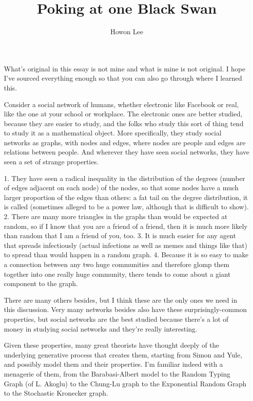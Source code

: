 \documentclass[12pt]{article}
\begin{document}
\title{Poking at one Black Swan}
\author{Howon Lee}
\maketitle

What's original in this essay is not mine and what is mine is not original. I hope I've sourced everything enough so that you can also go through where I learned this.

Consider a social network of humans, whether electronic like Facebook or real, like the one at your school or workplace. The electronic ones are better studied, because they are easier to study, and the folks who study this sort of thing tend to study it as a mathematical object. More specifically, they study social networks as graphs, with nodes and edges, where nodes are people and edges are relations between people. And wherever they have seen social networks, they have seen a set of strange properties. 

1. They have seen a radical inequality in the distribution of the degrees (number of edges adjacent on each node) of the nodes, so that some nodes have a much larger proportion of the edges than others: a fat tail on the degree distribution, it is called (sometimes alleged to be a power law, although that is difficult to show).
2. There are many more triangles in the graphs than would be expected at random, so if I know that you are a friend of a friend, then it is much more likely than random that I am a friend of you, too.
3. It is much easier for any agent that spreads infectiously (actual infections as well as memes and things like that) to spread than would happen in a random graph.
4. Because it is so easy to make a connection between any two huge communities and therefore glomp them together into one really huge community, there tends to come about a giant component to the graph.

There are many others besides, but I think these are the only ones we need in this discussion. Very many networks besides also have these surprisingly-common properties, but social networks are the best studied because there's a lot of money in studying social networks and they're really interesting.

Given these properties, many great theorists have thought deeply of the underlying generative process that creates them, starting from Simon and Yule, and possibly model them and their properties. I'm familiar indeed with a menagerie of them, from the Barabasi-Albert model to the Random Typing Graph (of L. Akoglu) to the Chung-Lu graph to the Exponential Random Graph to the Stochastic Kronecker graph.
\end{document}
